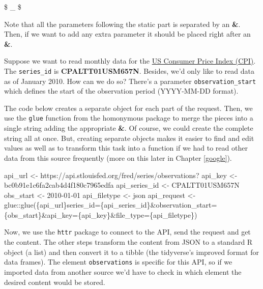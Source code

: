 \documentclass[
]{book}
\newenvironment{Shaded}{\begin{snugshade}}{\end{snugshade}}
\newcommand{\FunctionTok}[1]{\textcolor[rgb]{0.00,0.00,0.00}{#1}}
\newcommand{\NormalTok}[1]{#1}
\newcommand{\OtherTok}[1]{\textcolor[rgb]{0.56,0.35,0.01}{#1}}
\newcommand{\SpecialCharTok}[1]{\textcolor[rgb]{0.00,0.00,0.00}{#1}}
\newcommand{\StringTok}[1]{\textcolor[rgb]{0.31,0.60,0.02}{#1}}
\begin{document}
\$ \_ \$

Note that all the parameters following the static part is separated by an \textbf{\&}. Then, if we want to add any extra parameter it should be placed right after an \textbf{\&}.

Suppose we want to read monthly data for the \href{https://fred.stlouisfed.org/series/CPALTT01USM657N}{US Consumer Price Index (CPI)}. The \texttt{series\_id} is \textbf{CPALTT01USM657N}. Besides, we'd only like to read data as of January 2010. How can we do so? There's a parameter \texttt{observation\_start} which defines the start of the observation period (YYYY-MM-DD format).

The code below creates a separate object for each part of the request. Then, we use the \texttt{glue} function from the homonymous package to merge the pieces into a single string adding the appropriate \textbf{\&}. Of course, we could create the complete string all at once. But, creating separate objects makes it easier to find and edit values as well as to transform this task into a function if we had to read other data from this source frequently (more on this later in Chapter \ref{google}).

\begin{Shaded}
\begin{Highlighting}[]
\NormalTok{api\_url       }\OtherTok{\textless{}{-}} \StringTok{\textquotesingle{}https://api.stlouisfed.org/fred/series/observations?\textquotesingle{}}
\NormalTok{api\_key       }\OtherTok{\textless{}{-}} \StringTok{\textquotesingle{}bc0b91e1c6fa2cab4d4f180c7965edfa\textquotesingle{}}
\NormalTok{api\_series\_id }\OtherTok{\textless{}{-}} \StringTok{\textquotesingle{}CPALTT01USM657N\textquotesingle{}}
\NormalTok{obs\_start     }\OtherTok{\textless{}{-}} \StringTok{\textquotesingle{}2010{-}01{-}01\textquotesingle{}}
\NormalTok{api\_filetype  }\OtherTok{\textless{}{-}} \StringTok{\textquotesingle{}json\textquotesingle{}}
\NormalTok{api\_request   }\OtherTok{\textless{}{-}}\NormalTok{ glue}\SpecialCharTok{::}\FunctionTok{glue}\NormalTok{(}\StringTok{\textquotesingle{}\{api\_url\}series\_id=\{api\_series\_id\}\&observation\_start=\{obs\_start\}\&api\_key=\{api\_key\}\&file\_type=\{api\_filetype\}\textquotesingle{}}\NormalTok{)}
\end{Highlighting}
\end{Shaded}

Now, we use the \texttt{httr} package to connect to the API, send the request and get the content. The other steps transform the content from JSON to a standard R object (a list) and then convert it to a tibble (the tidyverse's improved format for data frames). The element \texttt{observations} is specific for this API, so if we imported data from another source we'd have to check in which element the desired content would be stored.
\end{document}
